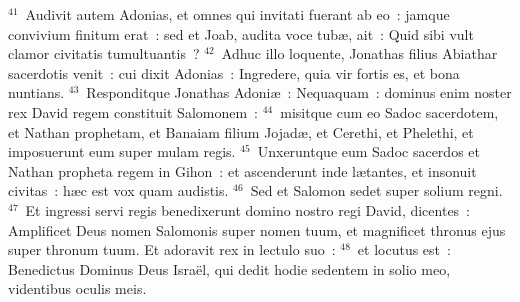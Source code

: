 ${}^{41}$~Audivit autem Adonias, et omnes qui invitati fuerant ab eo~: jamque convivium finitum erat~: sed et Joab, audita voce tub\ae , ait~: Quid sibi vult clamor civitatis tumultuantis~?
${}^{42}$~Adhuc illo loquente, Jonathas filius Abiathar sacerdotis venit~: cui dixit Adonias~: Ingredere, quia vir fortis es, et bona nuntians.
${}^{43}$~Responditque Jonathas Adoni\ae~: Nequaquam~: dominus enim noster rex David regem constituit Salomonem~:
${}^{44}$~misitque cum eo Sadoc sacerdotem, et Nathan prophetam, et Banaiam filium Jojad\ae , et Cerethi, et Phelethi, et imposuerunt eum super mulam regis.
${}^{45}$~Unxeruntque eum Sadoc sacerdos et Nathan propheta regem in Gihon~: et ascenderunt inde l\ae tantes, et insonuit civitas~: h\ae c est vox quam audistis.
${}^{46}$~Sed et Salomon sedet super solium regni.
${}^{47}$~Et ingressi servi regis benedixerunt domino nostro regi David, dicentes~: Amplificet Deus nomen Salomonis super nomen tuum, et magnificet thronus ejus super thronum tuum. Et adoravit rex in lectulo suo~:
${}^{48}$~et locutus est~: Benedictus Dominus Deus Isra\"el, qui dedit hodie sedentem in solio meo, videntibus oculis meis.


